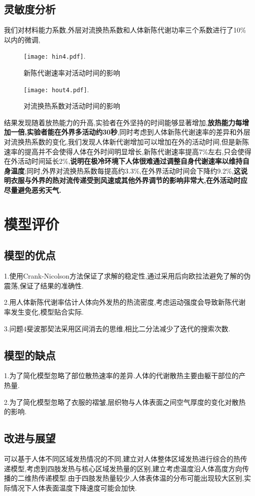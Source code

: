 \documentclass{whutmod}
\begin{document}
\subsection{灵敏度分析}
我们对材料能力系数,外层对流换热系数和人体新陈代谢功率三个系数进行了10\%以内的微调,
\begin{figure}[!htbp]
	\centering
	\texttt{[image: hin4.pdf]}.
	\caption{新陈代谢速率对活动时间的影响}
\end{figure} 
\begin{figure}[!htbp]
	\centering
	\texttt{[image: hout4.pdf]}.
	\caption{对流换热系数对活动时间的影响}
\end{figure} 
结果发现随着放热能力的升高,实验者在外坚持的时间能够显著增加,\textbf{放热能力每增加一倍,实验者能在外界多活动约30秒},同时考虑到人体新陈代谢速率的差异和外层对流换热系数的变化,我们发现人体新代谢增加可以增加在外的活动时间,但是新陈速率的提高并不会使得人体在外时间明显增长,新陈代谢速率提高7\%左右,只会使得在外活动时间延长2\%,\textbf{说明在极冷环境下人体很难通过调整自身代谢速率以维持自身温度};同时,外界对流换热系数每提高约3.3\%,在外界活动时间会下降约9.2\%,\textbf{这说明衣服与外界的热对流传递受到风速或其他外界调节的影响非常大,在外活动时应尽量避免恶劣天气.}


\section{模型评价}

\subsection{模型的优点}
1.使用Crank-Nicolson方法保证了求解的稳定性,通过采用后向欧拉法避免了解的伪震荡,保证了结果的准确性.

2.用人体新陈代谢率估计人体向外发热的热流密度,考虑运动强度会导致新陈代谢率发生变化,模型贴合实际.

3.问题4斐波那契法采用区间消去的思维,相比二分法减少了迭代的搜索次数.

\subsection{模型的缺点}

1.为了简化模型忽略了部位散热速率的差异.人体的代谢散热主要由躯干部位的产热量.

2.为了简化模型忽略了衣服的褶皱,层织物与人体表面之间空气厚度的变化对散热的影响.

\subsection{改进与展望}
可以基于人体不同区域发热情况的不同,建立对人体整体区域发热进行综合的热传递模型,考虑到四肢发热与核心区域发热量的区别,建立考虑温度沿人体高度方向传播的二维热传递模型.由于四肢发热量较少,人体表体温的分布可能出现较大区别,实际情况下人体表面温度下降速度可能会加快.
\end{document}
